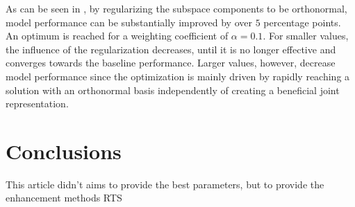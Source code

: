 \documentclass[10pt,twocolumn,letterpaper]{article}
\begin{document}
As can be seen in , by regularizing the subspace components to be orthonormal, model performance can be substantially improved by over $5$ percentage points.
An optimum is reached for a weighting coefficient of $\alpha=0.1$.
For smaller values, the influence of the regularization decreases, until it is no longer effective and converges towards the baseline performance.
Larger values, however, decrease model performance since the optimization is mainly driven by rapidly reaching a solution with an orthonormal basis independently of creating a beneficial joint representation.


\section{Conclusions}
\label{sec:5}
This article didn't aims to provide the best parameters, but to provide the enhancement methods RTS 


{\small


}
\end{document}

